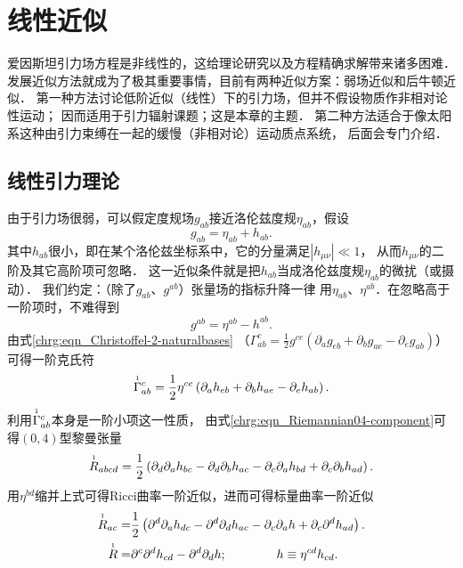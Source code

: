 
\chapter{线性近似}\label{chle}
爱因斯坦引力场方程是非线性的，这给理论研究以及方程精确求解带来诸多困难．
发展近似方法就成为了极其重要事情，目前有两种近似方案：弱场近似和后牛顿近似．
第一种方法讨论低阶近似（线性）下的引力场，但并不假设物质作非相对论性运动；
因而适用于引力辐射课题；这是本章的主题．
第二种方法适合于像太阳系这种由引力束缚在一起的缓慢（非相对论）运动质点系统，
后面会专门介绍．


\section{线性引力理论}
由于引力场很弱，可以假定度规场$g_{ab}$接近洛伦兹度规$\eta_{ab}$，假设
\begin{equation}\label{chle:eqn_g-eta+h}
    g_{ab}= \eta_{ab} + h_{ab}.
\end{equation}
其中$h_{ab}$很小，即在某个洛伦兹坐标系中，它的分量满足$|h_{\mu\nu}|\ll 1$，
从而$h_{\mu\nu}$的二阶及其它高阶项可忽略．
这一近似条件就是把$h_{ab}$当成洛伦兹度规$\eta_{ab}$的微扰（或摄动）．
我们约定：{\kaishu （除了$g_{ab}$、$g^{ab}$）张量场的指标升降一律
用$\eta_{ab}$、$\eta^{ab}$}．在忽略高于一阶项时，不难得到
\begin{equation}
    g^{ab}= \eta^{ab} - h^{ab}.
\end{equation}
由式\eqref{chrg:eqn_Christoffel-2-naturalbases}
（$\Gamma_{ab}^c = \frac{1}{2} g^{ce} ( \partial_a g_{eb}
 + \partial_b g_{ae}-\partial_e g_{ab} )$）
可得一阶克氏符
\begin{equation}\label{chle:eqn_Gamma1}
    \oversetmy{1}{\Gamma}_{ab}^c=\frac{1}{2} \eta^{ce}
    \left(\partial_a h_{eb} + \partial_b h_{ae}-\partial_e h_{ab}\right).
\end{equation}
利用$\oversetmy{1}{\Gamma}_{ab}^c$本身是一阶小项这一性质，
由式\eqref{chrg:eqn_Riemannian04-component}可得$(0,4)$型黎曼张量
\begin{equation}\label{chle:eqn_riemann1}
    \oversetmy{1}{R}_{abcd} = \frac{1}{2}\left(
      \partial_d\partial_{a} h_{bc} -\partial_d\partial_{b} h_{ac}
    - \partial_c\partial_{a} h_{bd} +\partial_c\partial_{b} h_{ad}\right) .
\end{equation}
用$\eta^{bd}$缩并上式可得Ricci曲率一阶近似，进而可得标量曲率一阶近似
\begin{align}
    \oversetmy{1}{R}_{ac} =& \frac{1}{2}\left(
    \partial^d\partial_{a} h_{dc} -\partial^d\partial_{d} h_{ac}
    - \partial_c\partial_{a} h +\partial_c\partial^{d} h_{ad}\right) .
     \label{chle:eqn_ricci1} \\
    \oversetmy{1}{R} =& \partial^c\partial^{d} h_{cd} -\partial^d\partial_{d} h ;
     \qquad\qquad h\equiv \eta^{cd} h_{cd} . \label{chle:eqn_scalar1}
\end{align}
